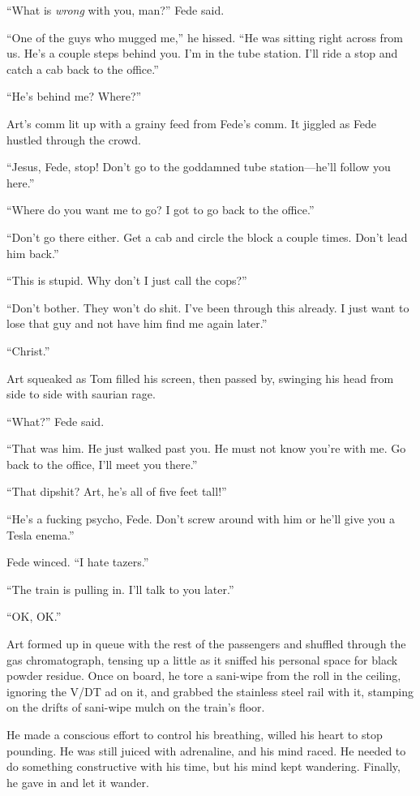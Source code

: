 “What is \emph{wrong} with you, man?” Fede said.

“One of the guys who mugged me,” he hissed. “He was sitting right
across from us. He’s a couple steps behind you. I’m in the tube
station. I’ll ride a stop and catch a cab back to the office.”

“He’s behind me? Where?”

Art’s comm lit up with a grainy feed from Fede’s comm. It jiggled
as Fede hustled through the crowd.

“Jesus, Fede, stop! Don’t go to the goddamned tube station—he’ll
follow you here.”

“Where do you want me to go? I got to go back to the office.”

“Don’t go there either. Get a cab and circle the block a couple
times. Don’t lead him back.”

“This is stupid. Why don’t I just call the cops?”

“Don’t bother. They won’t do shit. I’ve been through this already.
I just want to lose that guy and not have him find me again
later.”

“Christ.”

Art squeaked as Tom filled his screen, then passed by, swinging his
head from side to side with saurian rage.

“What?” Fede said.

“That was him. He just walked past you. He must not know you’re
with me. Go back to the office, I’ll meet you there.”

“That dipshit? Art, he’s all of five feet tall!”

“He’s a fucking psycho, Fede. Don’t screw around with him or he’ll
give you a Tesla enema.”

Fede winced. “I hate tazers.”

“The train is pulling in. I’ll talk to you later.”

“OK, OK.”

Art formed up in queue with the rest of the passengers and shuffled
through the gas chromatograph, tensing up a little as it sniffed
his personal space for black powder residue. Once on board, he tore
a sani-wipe from the roll in the ceiling, ignoring the V/DT ad on
it, and grabbed the stainless steel rail with it, stamping on the
drifts of sani-wipe mulch on the train’s floor.

He made a conscious effort to control his breathing, willed his
heart to stop pounding. He was still juiced with adrenaline, and
his mind raced. He needed to do something constructive with his
time, but his mind kept wandering. Finally, he gave in and let it
wander.

